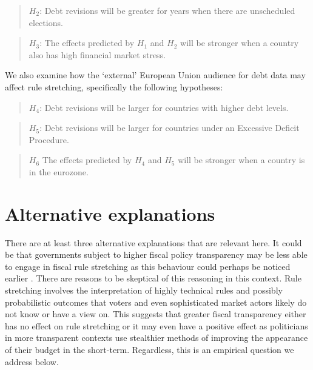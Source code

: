 \documentclass[]{article}
\begin{document}
\begin{quote}
    $H_{2}$: Debt revisions will be greater for years when there are unscheduled elections.
\end{quote}

\begin{quote}
    $H_{3}$: The effects predicted by $H_{1}$ and $H_{2}$ will be stronger when a country also has high financial market stress.
\end{quote}

We also examine how the `external' European Union audience for debt data may affect rule stretching, specifically the following hypotheses:

\begin{quote}
    $H_{4}$: Debt revisions will be larger for countries with higher debt levels.
\end{quote}

\begin{quote}
    $H_{5}$: Debt revisions will be larger for countries under an Excessive Deficit Procedure.
\end{quote}

\begin{quote}
	$H_{6}$ The effects predicted by $H_{4}$ and $H_{5}$ will be stronger when a country is in the eurozone.
\end{quote}

\section{Alternative explanations}

There are at least three alternative explanations that are relevant here. It could be that governments subject to higher fiscal policy transparency may be less able to engage in fiscal rule stretching as this behaviour could perhaps be noticed earlier \citep[e.g.][]{Alt2014}. There are reasons to be skeptical of this reasoning in this context. Rule stretching involves the interpretation of highly technical rules and possibly probabilistic outcomes that voters and even sophisticated market actors likely do not know or have a view on. This suggests that greater fiscal transparency either has no effect on rule stretching or it may even have a positive effect as politicians in more transparent contexts use stealthier methods of improving the appearance of their budget in the short-term. Regardless, this is an empirical question we address below.
\end{document}
